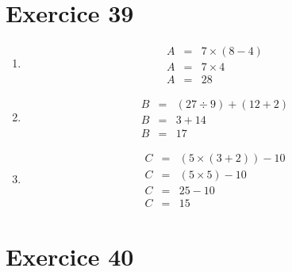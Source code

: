 \section*{Exercice 39}
	\begin{multicols}{3}
		\begin{enumerate}[label=\alph*.]
			
		\item \begin{eqnarray*}
			A &=& 7 \times (8 - 4) \\
			A &=& 7 \times 4 \\
			A &=& 28
		\end{eqnarray*}
		
		\item \begin{eqnarray*}
			B &=& (27 \div 9) + (12 + 2)\\
			B &=& 3 + 14\\
			B &=& 17
		\end{eqnarray*}
		
		\item \begin{eqnarray*}
			C &=& (5 \times (3 + 2)) - 10 \\
			C &=& (5 \times 5) - 10 \\
			C &=& 25 - 10 \\
			C &=& 15
		\end{eqnarray*}
		
	\end{enumerate}
	\end{multicols}

\section*{Exercice 40}

